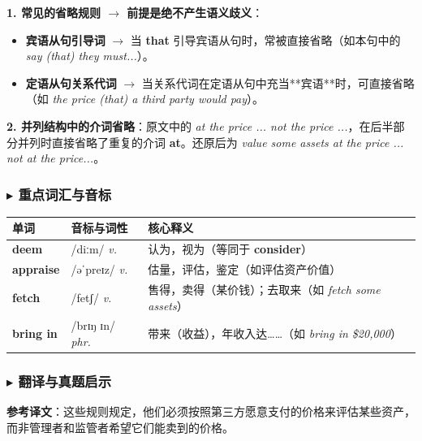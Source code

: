 \documentclass[cn,normal,11pt]{elegantnote}
\newcommand{\retrokey}[1]{{\color{accentcolor}\textbf{#1}}}
\renewcommand{\citshape}{\kaishu\fontspec{Arial}}
\begin{document}
\begin{proposition}[连词的并列省略与定语从句省略]
  \textbf{1. 常见的省略规则 $\rightarrow$ 前提是绝不产生语义歧义}：
  \begin{itemize}
    \item \textbf{宾语从句引导词} $\rightarrow$ 当 \textbf{that} 引导宾语从句时，常被直接省略（如本句中的 \textit{say (that) they must...}）。
    \item \textbf{定语从句关系代词} $\rightarrow$ 当关系代词在定语从句中充当**宾语**时，可直接省略（如 \textit{the price (that) a third party would pay}）。
  \end{itemize}
  \textbf{2. 并列结构中的介词省略}：原文中的 \textit{at the price ... not the price ...}，在后半部分并列时直接省略了重复的介词 \textbf{at}。还原后为 \textit{value some assets at the price ... not at the price...}。
\end{proposition}

\subsubsection*{$\blacktriangleright$ 重点词汇与音标}
\noindent
\begin{tabularx}{\textwidth}{l X p{7cm}}
  \toprule
  \textbf{单词} & \textbf{音标与词性} & \textbf{核心释义} \\
  \midrule
  \retrokey{deem} & {\citshape /diːm/} \textit{v.} & 认为，视为（等同于 \textbf{consider}） \\
  \midrule
  \retrokey{appraise} & {\citshape /əˈpreɪz/} \textit{v.} & 估量，评估，鉴定（如评估资产价值） \\
  \midrule
  \retrokey{fetch} & {\citshape /fetʃ/} \textit{v.} & 售得，卖得（某价钱）；去取来（如 \textit{fetch some assets}） \\
  \midrule
  \retrokey{bring in} & {\citshape /brɪŋ ɪn/} \textit{phr.} & 带来（收益），年收入达……（如 \textit{bring in \$20,000}） \\
  \bottomrule
\end{tabularx}

\subsubsection*{$\blacktriangleright$ 翻译与真题启示}
\begin{remark}
  \textbf{参考译文}：这些规则规定，他们必须按照第三方愿意支付的价格来评估某些资产，而非管理者和监管者希望它们能卖到的价格。
\end{remark}
\end{document}
